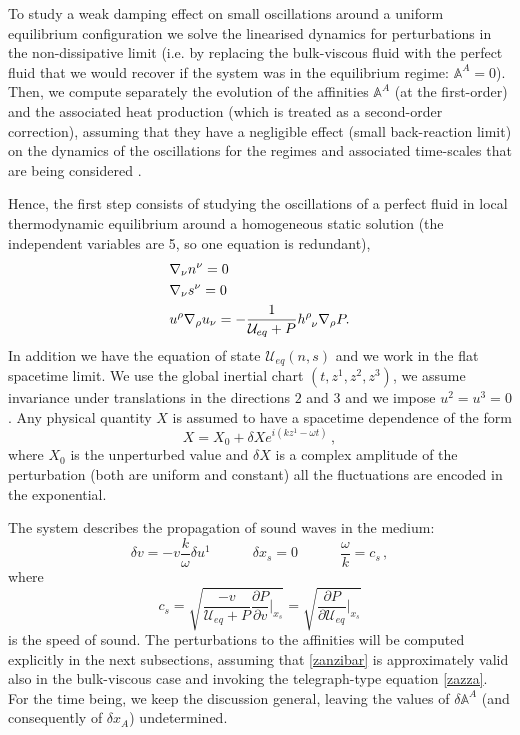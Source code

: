 \documentclass[useAMS,usenatbib,prd,twocolumn,nofootinbib]{revtex4-1}
\newcommand{\spc}{\quad \quad \quad}
\begin{document}
To study a weak damping effect on small oscillations around a uniform equilibrium configuration we solve the linearised dynamics for perturbations in the non-dissipative limit (i.e. by replacing the bulk-viscous fluid with the perfect fluid that we would recover if the system was in the equilibrium regime: $\mathbb{A}^A =0$). Then, we compute separately the evolution of the affinities $\mathbb{A}^A$  (at the first-order) and the associated heat production (which is treated as a second-order correction), assuming that they have a negligible effect (small back-reaction limit) on the dynamics of the oscillations for the regimes and associated time-scales that are being considered \citep{Sawyer_Bulk1989,Haensel_Bulk_hyperons}. 

Hence, the first step consists of studying the oscillations of a perfect fluid in local thermodynamic equilibrium around a homogeneous static solution  (the independent variables are 5, so one equation is redundant),
\begin{equation}
\begin{split}
& \nabla_\nu n^\nu =0 \\
& \nabla_\nu s^\nu =0 \\
& u^\rho \nabla_\rho u_\nu = - \dfrac{1}{\mathcal{U}_{eq} + P} h\indices{^\rho _\nu} \nabla_\rho P . \\
\end{split}
\end{equation}
In addition we have the equation of state $\mathcal{U}_{eq}(n,s)$ and we work in the flat spacetime limit. We use the global inertial chart $(t,z^1,z^2,z^3)$, we assume invariance under translations in the directions $2$ and $3$ and we impose $u^2=u^3=0$. Any physical quantity $X$ is assumed to have a spacetime dependence of the form
\begin{equation}
X = X_0 + \delta X e^{i(kz^1-\omega t)} \, ,
\end{equation}
where $X_0$ is the unperturbed value and $\delta X$ is a complex amplitude of the perturbation (both are uniform and constant) all the fluctuations are encoded in the exponential. 

The system describes the propagation of sound waves in the medium:
\begin{equation}\label{zanzibar}
\delta v = -v \dfrac{k}{\omega} \delta u^1  \spc  \delta x_s =0  \spc \dfrac{\omega}{k} = c_s \, ,
\end{equation}
where 
\begin{equation}
c_s =\sqrt{ \dfrac{-v}{\mathcal{U}_{eq} + P} \dfrac{\partial P}{\partial v} \bigg|_{x_s}  } =\sqrt{\dfrac{\partial P}{\partial \mathcal{U}_{eq}} \bigg|_{x_s}}
\end{equation}
is the speed of sound. The perturbations to the affinities will be computed explicitly in the next subsections, assuming that \eqref{zanzibar} is approximately valid also in the bulk-viscous case and invoking the telegraph-type equation \eqref{zazza}. For the time being, we keep the discussion general, leaving the values of $\delta \mathbb{A}^A$ (and consequently of $\delta x_A$) undetermined. 
\end{document}
